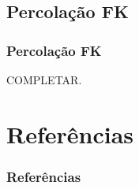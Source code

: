 \documentclass[9pt]{beamer}
\theoremstyle{definition} %
\begin{document}
	\subsection{Percolação FK}
	\begin{frame}[t]
	\frametitle{Percolação FK}
		{\color{red}COMPLETAR.}
	\end{frame}

	\section{Referências}
	\begin{frame}[t]
		\frametitle{Referências}\vspace{5pt}
		\nocite{duminil2019sharp}
		
		
	\end{frame}
\end{document}
